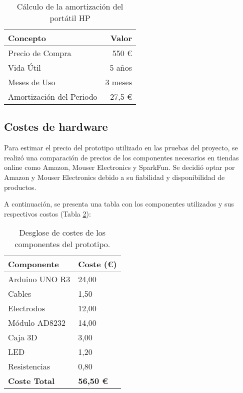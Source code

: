 \begin{table}[h]
\centering
\begin{tabular}{|l|r|}
\hline
\rowcolor[HTML]{EFEFEF} \textbf{Concepto} & \textbf{Valor} \\
\hline Precio de Compra & 550 € \\
\hline Vida Útil & 5 años \\
\hline Meses de Uso & 3 meses \\
\hline Amortización del Periodo & 27,5 € \\
\hline
\end{tabular}
\caption{Cálculo de la amortización del portátil HP}
\label{table:amortizacion}
\end{table}




\subsection{Costes de hardware}

Para estimar el precio del prototipo utilizado en las pruebas del proyecto, se realizó una comparación de precios de los componentes necesarios en tiendas online como Amazon, Mouser Electronics y SparkFun. Se decidió optar por Amazon y Mouser Electronics debido a su fiabilidad y disponibilidad de productos.

A continuación, se presenta una tabla con los componentes utilizados y sus respectivos costos (Tabla \ref{tabla-costes-hardware}):

\begin{table}[h]
    \centering
    \begin{tabular}{ll}
        \hline
        \rowcolor[HTML]{FFFFFF} 
        \textbf{Componente} & \textbf{Coste (€)} \\ \hline
        \rowcolor[HTML]{EFEFEF} 
        Arduino UNO R3 & 24,00 \\ \hline
        \rowcolor[HTML]{FFFFFF} 
        Cables & 1,50 \\ \hline
        \rowcolor[HTML]{EFEFEF} 
        Electrodos & 12,00 \\ \hline
        \rowcolor[HTML]{FFFFFF} 
        Módulo AD8232 & 14,00 \\ \hline
        \rowcolor[HTML]{EFEFEF} 
        Caja 3D & 3,00 \\ \hline
        \rowcolor[HTML]{FFFFFF} 
        LED & 1,20 \\ \hline
        \rowcolor[HTML]{EFEFEF} 
        Resistencias & 0,80 \\ \hline
        \rowcolor[HTML]{C0C0C0} 
        \textbf{Coste Total} & \textbf{56,50 €} \\ \hline
    \end{tabular}
    \caption{Desglose de costes de los componentes del prototipo.}
    \label{tabla-costes-hardware}
\end{table}


